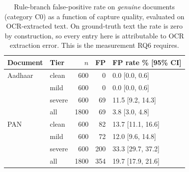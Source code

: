 \begin{table}[t]
\caption{Rule-branch false-positive rate on \emph{genuine} documents
(category C0) as a function of capture quality, evaluated on
OCR-extracted text. On ground-truth text the rate is zero by
construction, so every entry here is attributable to OCR extraction
error. This is the measurement RQ6 requires.}
\label{tab:fpr}
\centering
\footnotesize
\begin{tabular}{@{}llrrl@{}}
\toprule
Document & Tier & $n$ & FP & FP rate \% [95\% CI] \\
\midrule
Aadhaar & clean & 600 & 0 & 0.0 [0.0, 0.6] \\
 & mild & 600 & 0 & 0.0 [0.0, 0.6] \\
 & severe & 600 & 69 & 11.5 [9.2, 14.3] \\
 & all & 1800 & 69 & 3.8 [3.0, 4.8] \\
\midrule
PAN & clean & 600 & 82 & 13.7 [11.1, 16.6] \\
 & mild & 600 & 72 & 12.0 [9.6, 14.8] \\
 & severe & 600 & 200 & 33.3 [29.7, 37.2] \\
 & all & 1800 & 354 & 19.7 [17.9, 21.6] \\
\bottomrule
\end{tabular}
\end{table}
